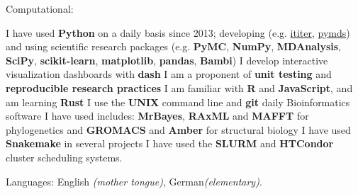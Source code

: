 \documentclass[10pt,a4paper]{article}
\begin{document}
\spacedhrule{0.9em}{-0.4em}


\inlineheadsection  %
{Computational:} {
  
  I have used \textbf{Python} on a daily basis since 2013; developing (e.g.\@
  \href{https://ititer.readthedocs.io/}{ititer},
  \href{https://pymds.readthedocs.io}{pymds}) and using scientific research packages
  (e.g. \textbf{PyMC}, \textbf{NumPy}, \textbf{MDAnalysis}, \textbf{SciPy},
  \textbf{scikit-learn}, \textbf{matplotlib}, \textbf{pandas}, \textbf{Bambi}) \sbull I
  develop interactive visualization dashboards with \textbf{dash} \sbull I am a proponent of
  \textbf{unit testing} and \textbf{reproducible research practices} \sbull I am familiar
  with \textbf{R} and \textbf{JavaScript}, and am learning \textbf{Rust} \sbull I use the
  \textbf{UNIX} command line and \textbf{git} daily \sbull Bioinformatics software I have
  used includes: \textbf{MrBayes}, \textbf{RAxML} and \textbf{MAFFT} for phylogenetics
  and \textbf{GROMACS} and \textbf{Amber} for structural biology \sbull I have used
  \textbf{Snakemake} in several projects \sbull I have used the \textbf{SLURM} and
  \textbf{HTCondor} cluster scheduling systems.}

\vspace{0.5em}
\inlineheadsection
{Languages:}
{English \emph{(mother tongue)}, German\emph{(elementary)}.}



\nocite{*}
\printbibliography[title=Publications]
\end{document}
